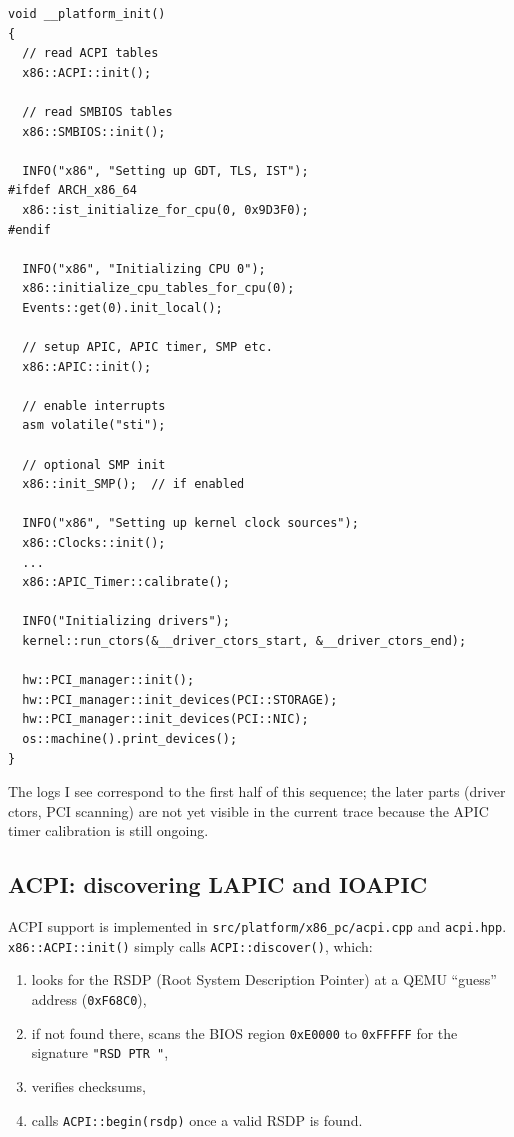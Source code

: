 \documentclass[a4paper,11pt]{article}
\begin{document}
\begin{verbatim}
void __platform_init()
{
  // read ACPI tables
  x86::ACPI::init();

  // read SMBIOS tables
  x86::SMBIOS::init();

  INFO("x86", "Setting up GDT, TLS, IST");
#ifdef ARCH_x86_64
  x86::ist_initialize_for_cpu(0, 0x9D3F0);
#endif

  INFO("x86", "Initializing CPU 0");
  x86::initialize_cpu_tables_for_cpu(0);
  Events::get(0).init_local();

  // setup APIC, APIC timer, SMP etc.
  x86::APIC::init();

  // enable interrupts
  asm volatile("sti");

  // optional SMP init
  x86::init_SMP();  // if enabled

  INFO("x86", "Setting up kernel clock sources");
  x86::Clocks::init();
  ...
  x86::APIC_Timer::calibrate();

  INFO("Initializing drivers");
  kernel::run_ctors(&__driver_ctors_start, &__driver_ctors_end);

  hw::PCI_manager::init();
  hw::PCI_manager::init_devices(PCI::STORAGE);
  hw::PCI_manager::init_devices(PCI::NIC);
  os::machine().print_devices();
}
\end{verbatim}

The logs I see correspond to the first half of this sequence; the later
parts (driver ctors, PCI scanning) are not yet visible in the current
trace because the APIC timer calibration is still ongoing.

\subsection{ACPI: discovering LAPIC and IOAPIC}

ACPI support is implemented in \texttt{src/platform/x86\_pc/acpi.cpp} and
\texttt{acpi.hpp}. \texttt{x86::ACPI::init()} simply calls
\texttt{ACPI::discover()}, which:

\begin{enumerate}
  \item looks for the RSDP (Root System Description Pointer) at a QEMU
        “guess” address (\texttt{0xF68C0}),
  \item if not found there, scans the BIOS region \texttt{0xE0000} to
        \texttt{0xFFFFF} for the signature \texttt{"RSD PTR "},
  \item verifies checksums,
  \item calls \texttt{ACPI::begin(rsdp)} once a valid RSDP is found.
\end{enumerate}
\end{document}
